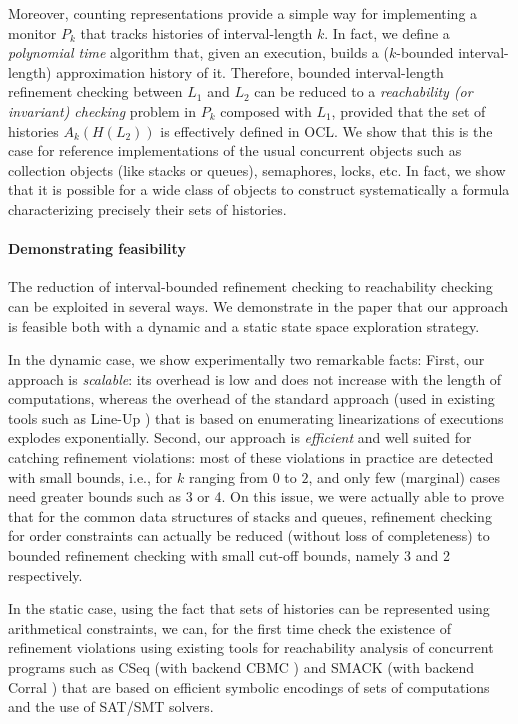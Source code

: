 Moreover, counting representations provide a simple way for implementing a
monitor $P_k$ that tracks histories of interval-length $k$. In fact, we define
a \emph{polynomial time} algorithm that, given an execution, builds a
($k$-bounded interval-length) approximation history of it. Therefore, bounded
interval-length refinement checking between $L_1$ and $L_2$ can be reduced to a
\emph{reachability (or invariant) checking} problem in $P_k$ composed with
$L_1$, provided that the set of histories $A_k(H(L_2))$ is effectively defined
in OCL. We show that this is the case for reference implementations of the
usual concurrent objects such as collection objects (like stacks or queues),
semaphores, locks, etc. In fact, we show that it is possible for a wide class
of objects to construct systematically a formula characterizing precisely their
sets of histories.

\paragraph{Demonstrating feasibility}

The reduction of interval-bounded refinement checking to reachability checking
can be exploited in several ways. We demonstrate in the paper that our approach
is feasible both with a dynamic and a static state space exploration strategy.

In the dynamic case, we show experimentally two remarkable facts: First, our
approach is \emph{scalable}: its overhead is low and does not increase with the
length of computations, whereas the overhead of the standard approach (used in
existing tools such as Line-Up \cite{}) that is based on enumerating
linearizations of executions explodes exponentially. Second, our approach is
\emph{efficient} and well suited for catching refinement violations: most of
these violations in practice are detected with small bounds, i.e., for $k$
ranging from 0 to $2$, and only few (marginal) cases need greater bounds such
as 3 or 4. On this issue, we were actually able to prove that for the common
data structures of stacks and queues, refinement checking for order constraints
can actually be reduced (without loss of completeness) to bounded refinement
checking with small cut-off bounds, namely 3 and 2 respectively.

In the static case, using the fact that sets of histories can be represented
using arithmetical constraints, we can, for the first time check the existence
of refinement violations using existing tools for reachability analysis of
concurrent programs such as CSeq \cite{} (with backend CBMC \cite{}) and SMACK
\cite{} (with backend Corral \cite{}) that are based on efficient symbolic
encodings of sets of computations and the use of SAT/SMT solvers.

